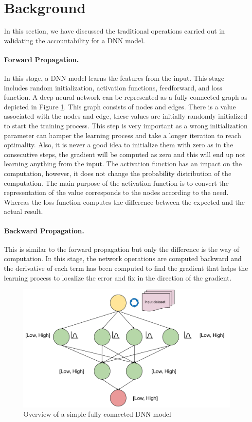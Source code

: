 \section{Background}
\label{sec:background}
In this section, we have discussed the traditional operations carried out in validating the accountability for a DNN model.
\paragraph{Forward Propagation.} In this stage, a DNN model learns the features from the input. This stage includes random initialization, activation functions, feedforward, and loss function. A deep neural network can be represented as a fully connected graph as depicted in Figure \ref{fig:rq5}. This graph consists of nodes and edges. There is a value associated with the nodes and edge, these values are initially randomly initialized to start the training process. This step is very important as a wrong initialization parameter can hamper the learning process and take a longer iteration to reach optimality. Also, it is never a good idea to initialize them with zero as in the consecutive steps, the gradient will be computed as zero and this will end up not learning anything from the input. The activation function has an impact on the computation, however, it does not change the probability distribution of the computation. The main purpose of the activation function is to convert the representation of the value corresponds to the nodes according to the need. Whereas the loss function computes the difference between the expected and the actual result.
\paragraph{Backward Propagation.} This is similar to the forward propagation but only the difference is the way of computation. In this stage, the network operations are computed backward and the derivative of each term has been computed to find the gradient that helps the learning process to localize the error and fix in the direction of the gradient.
\begin{figure}
	\includegraphics[width=\linewidth]{overview}
	\caption{Overview of a simple fully connected DNN model}
	\label{fig:rq5}
\end{figure}
